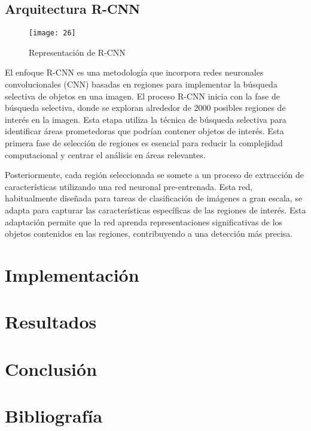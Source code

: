 	\subsection{Arquitectura R-CNN}
	
	\begin{wrapfigure}[19]{R}{.43\textwidth} 
		\centering
		\texttt{[image: 26]}
		\caption{Representación de R-CNN}
	\end{wrapfigure}

	El enfoque R-CNN es una metodología que incorpora redes neuronales convolucionales (CNN) basadas en regiones para implementar la búsqueda selectiva de objetos en una imagen.
El proceso R-CNN inicia con la fase de búsqueda selectiva, donde se exploran alrededor de 2000 posibles regiones de interés en la imagen. Esta etapa utiliza la técnica de búsqueda selectiva para identificar áreas prometedoras que podrían contener objetos de interés. Esta primera fase de selección de regiones es esencial para reducir la complejidad computacional y centrar el análisis en áreas relevantes.

	Posteriormente, cada región seleccionada se somete a un proceso de extracción de características utilizando una red neuronal pre-entrenada. Esta red, habitualmente diseñada para tareas de clasificación de imágenes a gran escala, se adapta para capturar las características específicas de las regiones de interés. Esta adaptación permite que la red aprenda representaciones significativas de los objetos contenidos en las regiones, contribuyendo a una detección más precisa.


	

\section{Implementación}
\section{Resultados}
\section{Conclusión}
\section{Bibliografía}
